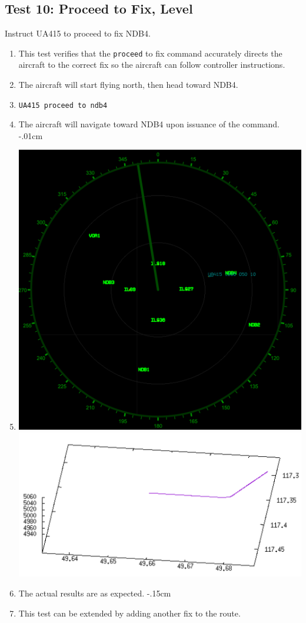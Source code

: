 \documentclass[letterpaper, 12pt]{article}
\begin{document}
\subsection{Test 10: Proceed to Fix, Level}
Instruct UA415 to proceed to fix NDB4.
\begin{enumerate}\itemsep-.15cm
\item This test verifies that the \verb!proceed! to fix command accurately directs the aircraft to the correct fix so the aircraft can follow controller instructions.
\item The aircraft will start flying north, then head toward NDB4.
\item \verb!UA415 proceed to ndb4!
\item The aircraft will navigate toward NDB4 upon issuance of the command.
\itemsep-.01cm
\item \includegraphics[scale=.3,valign=t]{test10_1.png}\includegraphics[scale=.5,valign=t]{test10_2.png}
\item The actual results are as expected.
\itemsep-.15cm
\item This test can be extended by adding another fix to the route.
\end{enumerate}
\end{document}
